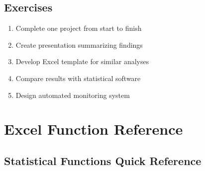 \documentclass[12pt,a4paper]{book}
\begin{document}
{{\section{Exercises}

\begin{enumerate}
    \item Complete one project from start to finish
    \item Create presentation summarizing findings
    \item Develop Excel template for similar analyses
    \item Compare results with statistical software
    \item Design automated monitoring system
\end{enumerate}

\appendix

\chapter{Excel Function Reference}

\section{Statistical Functions Quick Reference}

}}
\end{document}
